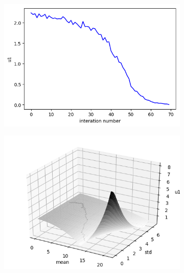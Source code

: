 \documentclass{article}
\begin{document}
\begin{figure}[h]
	\centering
	\begin{subfigure}[t]{0.32\linewidth}
		\centering
		\includegraphics[width = 1.0\linewidth, trim={0 0 0 10}, clip=true]{descent.png}
		\label{fig:iter}	
	\end{subfigure}
	\hspace{0.1\linewidth}
	\begin{subfigure}[t]{0.35\linewidth}
		\centering
		\includegraphics[width = 1.0\linewidth, trim={0 0 0 10}, clip=true]{projected_descent.png}
		\label{fig:proj}	
	\end{subfigure}
\label{fig:descent}
\caption{}
\end{figure}
\end{document}
